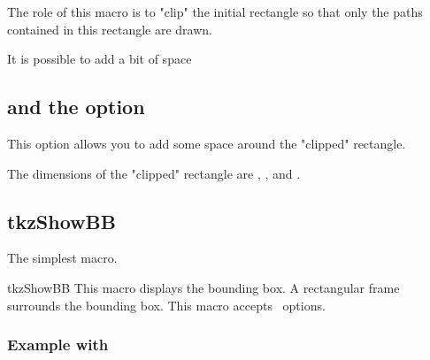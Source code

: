 The role of this macro is to "clip" the initial rectangle so that only the paths contained in this rectangle are drawn.

\begin{tkzexample}[latex=8cm,small]
\end{tkzexample} 

It is possible to add a bit of space
\begin{tkzltxexample}[]
  \tkzClip[space=1]
\end{tkzltxexample} 

\subsection{ and the option } 
This option allows you to add some space around the "clipped" rectangle.
\begin{tkzexample}[latex=8cm,small]
\end{tkzexample}   
The dimensions of the "clipped" rectangle are , ,  and . 

\subsection{tkzShowBB}
The simplest macro. 
\begin{NewMacroBox}{tkzShowBB}{}%
This macro displays the bounding box. A rectangular frame surrounds the bounding box. This macro accepts \TIKZ\ options.
\end{NewMacroBox} 


\subsubsection{Example with }
\begin{tkzexample}[latex=8cm,small]
\end{tkzexample}
